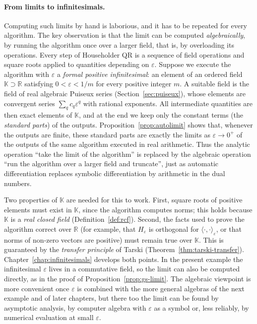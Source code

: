 \documentclass[12pt, a4paper]{report}
\theoremstyle{plain}
\theoremstyle{definition}
\theoremstyle{remark}
\theoremstyle{plain}
\newcommand{\RR}{\mathbb{R}}
\newcommand{\KK}{\mathbb{K}}
\begin{document}
\paragraph{From limits to infinitesimals.}
Computing such limits by hand is laborious, and it has to be repeated for every algorithm. The key observation is that the limit can be computed \emph{algebraically}, by running the algorithm once over a larger field, that is, by overloading its operations. Every step of Householder QR is a sequence of field operations and square roots applied to quantities depending on $\varepsilon$. Suppose we execute the algorithm with $\varepsilon$ a \emph{formal positive infinitesimal}: an element of an ordered field $\KK\supset\RR$ satisfying $0<\varepsilon<1/m$ for every positive integer $m$. A suitable field is the field of real algebraic Puiseux series (Section~\ref{sec:puiseux}), whose elements are convergent series $\sum_{q} c_q\varepsilon^{q}$ with rational exponents. All intermediate quantities are then exact elements of $\KK$, and at the end we keep only the constant terms (the \emph{standard parts}) of the outputs. Proposition~\ref{prop:autolimit} shows that, whenever the outputs are finite, these standard parts are exactly the limits as $\varepsilon\to 0^+$ of the outputs of the same algorithm executed in real arithmetic. Thus the analytic operation ``take the limit of the algorithm'' is replaced by the algebraic operation ``run the algorithm over a larger field and truncate'', just as automatic differentiation replaces symbolic differentiation by arithmetic in the dual numbers.

Two properties of $\KK$ are needed for this to work. First, square roots of positive elements must exist in $\KK$, since the algorithm computes norms; this holds because $\KK$ is a \emph{real closed field} (Definition~\ref{def:rcf}). Second, the facts used to prove the algorithm correct over $\RR$ (for example, that $H_\varepsilon$ is orthogonal for $\langle\cdot,\cdot\rangle_\varepsilon$, or that norms of non-zero vectors are positive) must remain true over $\KK$. This is guaranteed by the \emph{transfer principle} of Tarski (Theorem~\ref{thm:tarski-transfer}). Chapter~\ref{chap:infinitesimals} develops both points. In the present example the infinitesimal $\varepsilon$ lives in a commutative field, so the limit can also be computed directly, as in the proof of Proposition~\ref{prop:gs-limit}. The algebraic viewpoint is more convenient once $\varepsilon$ is combined with the more general algebras of the next example and of later chapters, but there too the limit can be found by asymptotic analysis, by computer algebra with $\varepsilon$ as a symbol or, less reliably, by numerical evaluation at small $\varepsilon$.
\end{document}
